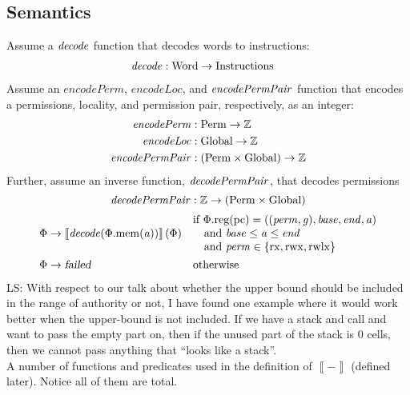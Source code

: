 \documentclass[a4paper]{article}
\newcommand{\sem}[1]{\left\llbracket #1 \right\rrbracket}
\newcommand{\fun}{\rightarrow}
\newcommand\lau[1]{{\color{purple} \sf \footnotesize {LS: #1}}\\}
\newcommand{\var}[1]{\mathit{#1}}
\newcommand{\gl}{\var{g}}
\newcommand{\pcreg}{\mathrm{pc}}
\newcommand{\addr}{\var{a}}
\newcommand{\start}{\var{base}}
\newcommand{\addrend}{\var{end}}
\newcommand{\perm}{\var{perm}}
\newcommand{\stdcap}[1][(\perm,\gl)]{\left(#1,\start,\addrend,\addr \right)}
\newcommand{\plainproj}[1]{\mathrm{#1}}
\newcommand{\memheap}[1][\Phi]{#1.\plainproj{mem}}
\newcommand{\memreg}[1][\Phi]{#1.\plainproj{reg}}
\newcommand{\failed}{\textsl{failed}}
\newcommand{\plainfun}[2]{
  \ifthenelse{\equal{#2}{}}
  {\mathit{#1}}
  {\mathit{#1}(#2)}
}
\newcommand{\decode}{\plainfun{decode}{}}
\newcommand{\encodePerm}{\mathit{encodePerm}}
\newcommand{\encodePermPair}{\plainfun{encodePermPair}{}}
\newcommand{\encodeLoc}{\mathit{encodeLoc}{}}
\newcommand{\decodePermPair}{\plainfun{decodePermPair}}
\newcommand{\plaindom}[1]{\mathrm{#1}}
\newcommand{\Words}{\plaindom{Word}}
\newcommand{\Instrs}{\plaindom{Instructions}}
\newcommand{\ints}{\mathbb{Z}}
\newcommand{\Perms}{\plaindom{Perm}}
\newcommand{\Globals}{\plaindom{Global}}
\newcommand{\plainperm}[1]{\mathrm{#1}}
\newcommand{\exec}{\plainperm{rx}}
\newcommand{\rwx}{\plainperm{rwx}}
\newcommand{\rwlx}{\plainperm{rwlx}}
\begin{document}
\subsection*{Semantics}
Assume a $\decode$ function that decodes words to instructions:
\begin{align*}
  \decode &:\Words \fun \Instrs
\end{align*}
Assume an $\encodePerm$, $\encodeLoc$, and $\encodePermPair$ function that encodes a permissions, locality, and permission pair, respectively, as an integer:
\begin{align*}
  \encodePerm &: \Perms \fun \ints \\
  \encodeLoc &: \Globals \fun \ints \\
  \encodePermPair &: (\Perms \times \Globals) \fun \ints \\
\end{align*}
Further, assume an inverse function, $\decodePermPair{}$, that decodes permissions
\[
  \decodePermPair{} : \ints \fun (\Perms \times \Globals)
\]
\begin{align*}
  \Phi & \rightarrow \sem{\decode(\memheap(\addr))}(\Phi) & &                                   
                                                              \arraycolsep=0pt
                                                              \begin{array}{l}
                                                                \text{if $\memreg(\pcreg) = \stdcap$}\\
                                                                \quad\text{and $\start \leq \addr \leq \addrend$}\\
                                                                \quad\text{and $\perm \in \{ \exec,\rwx, \rwlx \}$ }
                                                              \end{array}\\
  \Phi & \rightarrow \failed                                 & & \text{otherwise}
\end{align*}
\lau{With respect to our talk about whether the upper bound should be included in the range of authority or not, I have found one example where it would work better when the upper-bound is not included. If we have a stack and call and want to pass the empty part on, then if the unused part of the stack is 0 cells, then we cannot pass anything that ``looks like a stack''.}
A number of functions and predicates used in the definition of $\sem{-}$ (defined later). Notice all of them are total.
\end{document}
